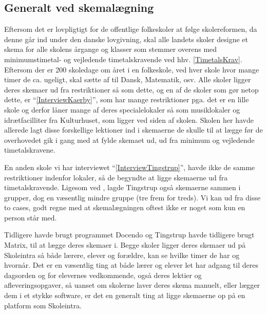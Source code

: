 \subsection{Generalt ved skemalægning}
Eftersom det er lovpligtigt for de offentlige folkeskoler at følge skolereformen, da denne går ind under den danske lovgivning, skal alle landets skoler designe et skema for alle skolens årgange og klasser som stemmer overens med minimumstimetal- og vejledende timetalskravende ved hhv. \ref{TimetalsKrav}. Eftersom der er 200 skoledage om året i en folkeskole\cite{elevers_timetal}, ved hver skole hvor mange timer de ca. ugeligt, skal sætte af til Dansk, Matematik, osv. Alle skoler ligger deres skemaer ud fra restriktioner så som dette, og en af de skoler som gør netop dette, er \school ``\ref{InterviewKaerby}'', som har mange restriktioner pga. det er en lille skole og derfor låner mange af deres specialelokaler så som musiklokaler og idrætfacilliter fra Kulturhuset, som ligger ved siden af skolen. Skolen her havde allerede lagt disse forskellige lektioner ind i skemaerne de skulle til at lægge før de overhovedet gik i gang med at fylde skemaet ud, ud fra minimum og vejledende timetalskravene.

En anden skole vi har interviewet ``\ref{InterviewTingstrup}'', havde ikke de samme restriktioner indenfor lokaler, så de begyndte at ligge skemaerne ud fra timetalskravende. Ligesom ved \school, lagde Tingstrup også skemaerne sammen i grupper, dog en væsentlig mindre gruppe (tre frem for treds). Vi kan ud fra disse to cases, godt regne med at skemalægningen oftest ikke er noget som kun en person står med.

Tidligere havde \school brugt programmet Docendo og Tingstrup havde tidligere brugt Matrix, til at lægge deres skemaer i. Begge skoler ligger deres skemaer ud på Skoleintra så både lærere, elever og forældre, kan se hvilke timer de har og hvornår. Det er en væsentlig ting at både lærer og elever let har adgang til deres dagsorden og for elevernes vedkommende, også deres lektier og afleveringsopgaver, så uanset om skolerne laver deres skema manuelt, eller lægger dem i et stykke software, er det en generalt ting at ligge skemaerne op på en platform som Skoleintra.
